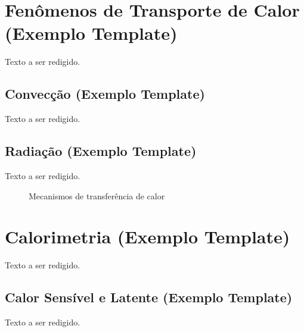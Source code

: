 \section{Fenômenos de Transporte de Calor (Exemplo Template)}

Texto a ser redigido.

\subsection{Convecção (Exemplo Template)}

Texto a ser redigido.

\subsection{Radiação (Exemplo Template)}

Texto a ser redigido.

\begin{figure}[H]
\centering
\caption{Mecanismos de transferência de calor}
\end{figure}

\section{Calorimetria (Exemplo Template)}

Texto a ser redigido.

\subsection{Calor Sensível e Latente (Exemplo Template)}

Texto a ser redigido.